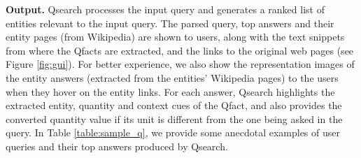\noindent \textbf{Output.} Qsearch processes the input query and generates a ranked list of entities relevant to the input query. 
The parsed query, top answers and their entity pages (from Wikipedia) are shown to users, along with the text snippets from where the Qfacts are extracted, and the links to the original web pages (see Figure \ref{fig:gui}). For better experience, we also show the representation images of the entity answers (extracted from the entities' Wikipedia pages) to the users when they hover on the entity links. For each answer, Qsearch highlights the extracted entity, quantity and context cues of the Qfact, and also provides the converted quantity value if its unit is different from the one being asked in the query. In Table \ref{table:sample_q}, we provide some anecdotal examples of user queries and their top answers produced by Qsearch.





